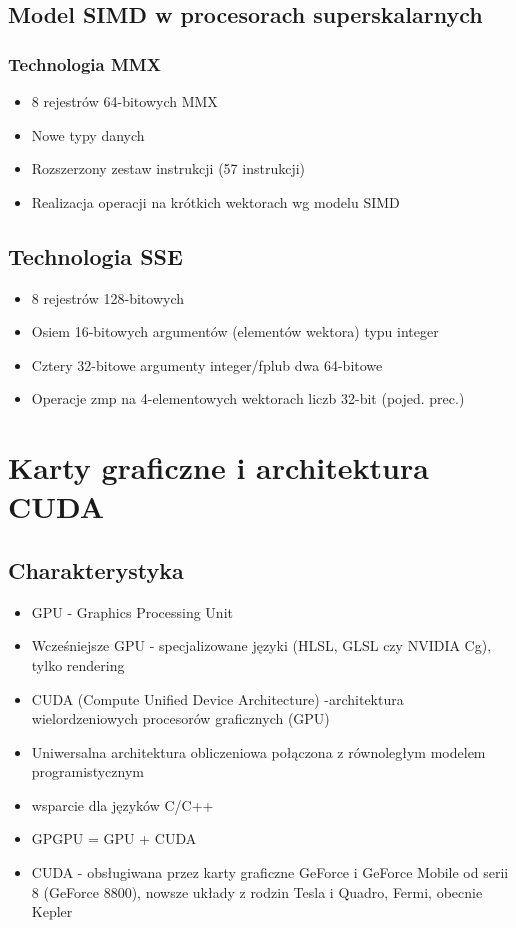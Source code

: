 \documentclass[a4paper,twoside]{article}
\begin{document}
		\subsection*{Model SIMD w procesorach superskalarnych}
			\subsubsection*{Technologia MMX}
			\begin{itemize}
				\item 8 rejestrów 64-bitowych MMX
				\item Nowe typy danych
				\item Rozszerzony zestaw instrukcji (57 instrukcji)
				\item Realizacja operacji na krótkich wektorach wg modelu SIMD
			\end{itemize}
			\subsection*{Technologia SSE}
			\begin{itemize}
				\item 8 rejestrów 128-bitowych
				\item Osiem 16-bitowych argumentów (elementów wektora) typu integer
				\item Cztery 32-bitowe argumenty integer/fplub dwa 64-bitowe
				\item Operacje zmp na 4-elementowych wektorach liczb 32-bit (pojed. prec.)
			\end{itemize}
			
	\section*{Karty graficzne i architektura CUDA}
		\subsection*{Charakterystyka}
		\begin{itemize}
			\item GPU - Graphics Processing Unit
			\item Wcześniejsze GPU - specjalizowane języki (HLSL, GLSL czy NVIDIA Cg), tylko rendering
			\item CUDA (Compute Unified Device Architecture) -architektura wielordzeniowych procesorów graficznych (GPU)
			\item Uniwersalna architektura obliczeniowa połączona z równoległym modelem programistycznym
			\item wsparcie dla języków C/C++
			\item GPGPU = GPU + CUDA
			\item CUDA - obsługiwana przez karty graficzne GeForce i GeForce Mobile od serii 8 (GeForce 8800), nowsze układy z rodzin Tesla i Quadro, Fermi, obecnie Kepler
		\end{itemize}
\end{document}
